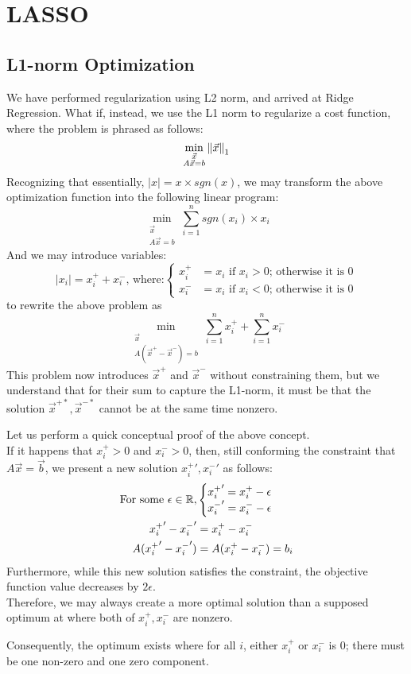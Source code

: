 \chapter{LASSO}

\section{L1-norm Optimization}
We have performed regularization using L2 norm, and arrived at Ridge Regression.
What if, instead, we use the L1 norm to regularize a cost function, where the problem is phrased as follows:
\[
    \min_{
        \substack{
            \vec{x} \\
            A \vec{x} = b
        }
    } {\| \vec{x} \|}_{1}^{}
\]
Recognizing that essentially, $|x| = x \times sgn(x)$, we may transform the above optimization function into the following linear program:
\[
    \min_{
        \substack{
            \vec{x} \\
            A \vec{x} = b
        }
    } \sum_{i = 1}^n sgn(x_i) \times x_i
\]
And we may introduce variables:
\[
    |x_i| = x_i^+ + x_i^- \text{, where:}
    \begin{cases}
        x_i^+ &= x_i \text{ if } x_i > 0 \text{; otherwise it is } 0 \\
        x_i^- &= x_i \text{ if } x_i < 0 \text{; otherwise it is } 0
    \end{cases}
\]
to rewrite the above problem as
\[
    \min_{
        \substack{
            \vec{x} \\
            A (\vec{x}^+ - \vec{x}^-) = b
        }
    } \sum_{i = 1}^n x_i^+ + \sum_{i = 1}^n x_i^-
\]
This problem now introduces $\vec{x}^+$ and $\vec{x}^-$ without constraining them, but we understand that for their sum to capture the L1-norm, it must be that the solution $\vec{x}^{+*}, \vec{x}^{-*}$ cannot be at the same time nonzero.
\par
Let us perform a quick conceptual proof of the above concept. \\
If it happens that $x_i^+ > 0$ and $x_i^- > 0$, then, still conforming the constraint that $A \vec{x} = \vec{b}$, we present a new solution ${x_i^+}', {x_i^-}'$ as follows:
\begin{align*}
    \text{For some } \epsilon \in \mathbb{R},
    &\begin{cases}
        {x_i^+}' = x_i^+ - \epsilon \\
        {x_i^-}' = x_i^- - \epsilon \\
    \end{cases} \\
    {x_i^+}' - {x_i^-}' &= {x_i^+} - {x_i^-} \\
    A({x_i^+}' - {x_i^-}') &= A({x_i^+} - {x_i^-}) = b_i
\end{align*}
Furthermore, while this new solution satisfies the constraint, the objective function value decreases by $2 \epsilon$. \\
Therefore, we may always create a more optimal solution than a supposed optimum at where both of $x_i^+, x_i^-$ are nonzero.
\par
Consequently, the optimum exists where for all $i$, either $x_i^+$ or $x_i^-$ is $0$; there must be one non-zero and one zero component.

